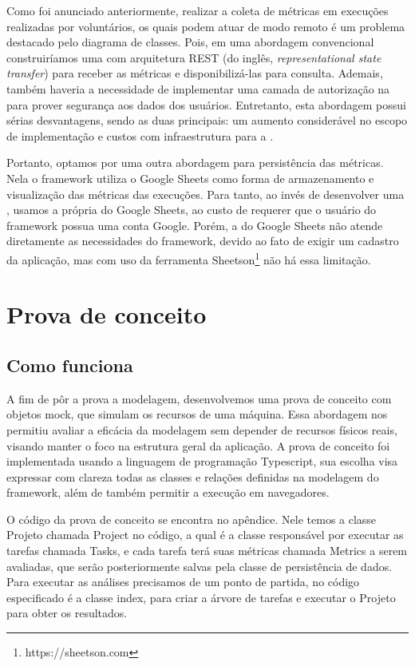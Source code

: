 \documentclass[12pt]{tcc}
\begin{document}
Como foi anunciado anteriormente, realizar a coleta de métricas em execuções realizadas por voluntários, os quais podem atuar de modo remoto é um problema destacado pelo diagrama de classes.
Pois, em uma abordagem convencional construiríamos uma  com arquitetura REST (do inglês, \emph{representational state transfer}) para receber as métricas e disponibilizá-las para consulta.
Ademais, também haveria a necessidade de implementar uma camada de autorização na  para prover segurança aos dados dos usuários.
Entretanto, esta abordagem possui sérias desvantagens, sendo as duas principais: um aumento considerável no escopo de implementação e custos com infraestrutura para a .

Portanto, optamos por uma outra abordagem para persistência das métricas.
Nela o framework utiliza o Google Sheets como forma de armazenamento e visualização das métricas das execuções.
Para tanto, ao invés de desenvolver uma , usamos a própria  do Google Sheets, ao custo de requerer que o usuário do framework possua uma conta Google.
Porém, a  do Google Sheets não atende diretamente as necessidades do framework, devido ao fato de exigir um cadastro da aplicação, mas com uso da ferramenta Sheetson\footnote{https://sheetson.com} não há essa limitação.


\chapter{Prova de conceito}
\label{cap:prova_de_conceito}
\section{Como funciona}
A fim de pôr a prova a modelagem, desenvolvemos uma prova de conceito com objetos mock, que simulam os recursos de uma máquina. Essa abordagem nos permitiu avaliar a eficácia da modelagem sem depender de recursos físicos reais, visando manter o foco na estrutura geral da aplicação. A prova de conceito foi implementada usando a linguagem de programação Typescript, sua escolha visa expressar com clareza todas as classes e relações definidas na modelagem do framework, além de também permitir a execução em navegadores.

O código da prova de conceito se encontra no apêndice. Nele temos a classe Projeto chamada Project no código, a qual é a classe responsável por executar as tarefas chamada Tasks, e cada tarefa terá suas métricas chamada Metrics a serem avaliadas, que serão posteriormente salvas pela classe de persistência de dados. Para executar as análises precisamos de um ponto de partida, no código especificado é a classe index, para criar a árvore de tarefas e executar o Projeto para obter os resultados.
\end{document}
